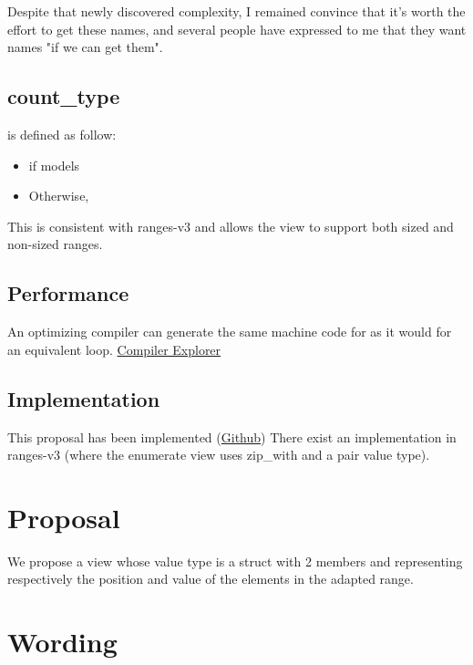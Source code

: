 \documentclass{wg21}
\begin{document}
Despite that newly discovered complexity, I remained convince that it's worth the effort to get these names,
and several people have expressed to me that they want names "if we can get them".

\subsection{count_type}

 is defined as follow:
\begin{itemize}
    \item {} if  models 
    \item Otherwise, 
\end{itemize}

This is consistent with ranges-v3 and allows the view to support both sized and non-sized ranges.


\subsection{Performance}

An optimizing compiler can generate the same machine code for  as it would for an equivalent  loop.  \href{https://godbolt.org/z/2Kxo8d}{Compiler Explorer}


\subsection{Implementation}

This proposal has been implemented (\href{https://github.com/cor3ntin/rangesnext/blob/master/include/cor3ntin/rangesnext/enumerate.hpp}{Github})
There exist an implementation in ranges-v3 (where the enumerate view uses zip_with and a pair value type).

\section{Proposal}

We propose a view  whose value type is a struct with 2 members  and 
representing respectively the position and value of the elements in the adapted range.

\section{Wording}
\end{document}
